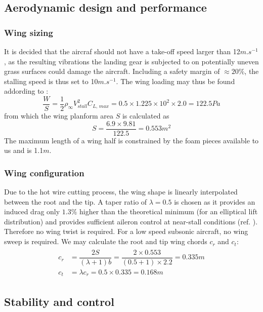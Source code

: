 \subsection{Aerodynamic design and performance}
\subsubsection{Wing sizing}
It is decided that the aircraf should not have a take-off speed larger than 12$\si{m.s^{-1}}$, as the resulting vibrations the landing gear is subjected to on potentially uneven grass surfaces could damage the aircraft. Including a safety margin of $\approx 20\%$, the stalling speed is thus set to 10$\si{m.s^{-1}}$. The wing loading may thus be found addording to \cite[p. 410]{anderson}:
\begin{equation}
  \dfrac{W}{S}=\dfrac{1}{2}\rho_{\infty}V_{stall}^2C_{L,\,max}=0.5\times 1.225\times 10^2\times 2.0=122.5\si{Pa}
\end{equation}
from which the wing planform area $S$ is calculated as
\begin{equation}
  S=\dfrac{6.9\times 9.81}{122.5}=0.553\si{m^2}
\end{equation}
The maximum length of a wing half is constrained by the foam pieces available to us and is 1.1$\si{m}$.

\subsubsection{Wing configuration}
Due to the hot wire cutting process, the wing shape is linearly interpolated between the root and the tip. A taper ratio of $\lambda=0.5$ is chosen as it provides an induced drag only $1.3\%$ higher than the theoretical minimum (for an elliptical lift distribution) and provides sufficient aileron control at near-stall conditions (ref. \cite[pp. 422-425]{anderson}). Therefore no wing twist is required. For a low speed subsonic aircraft, no wing sweep is required. We may calculate the root and tip wing chords $c_r$ and $c_t$:
\begin{align}
  \begin{split}
    c_r&=\dfrac{2S}{(\lambda +1)b}=\dfrac{2\times 0.553}{(0.5+1)\times 2.2}=0.335\si{m}\\
    c_t&=\lambda c_r=0.5\times 0.335=0.168\si{m}
  \end{split}
\end{align}

\subsection{Stability and control}

